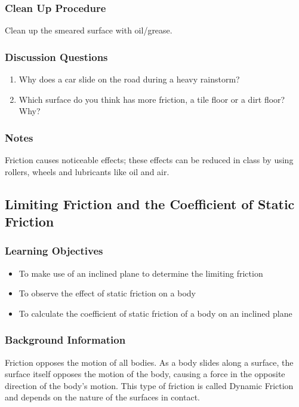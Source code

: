 \subsubsection*{Clean Up Procedure}
Clean up the smeared surface with oil/grease.

\subsubsection*{Discussion Questions}
\begin{enumerate}
\item{Why does a car slide on the road during a heavy rainstorm?}
\item{Which surface do you think has more friction, a tile floor or a dirt floor? Why?}
\end{enumerate}

\subsubsection*{Notes}
Friction causes noticeable effects; these effects can be reduced in class by using rollers, wheels and lubricants like oil and air.

\subsection{Limiting Friction and the Coefficient of Static Friction}

\subsubsection*{Learning Objectives}
\begin{itemize}
\item{To make use of an inclined plane to determine the limiting friction} 
\item{To observe the effect of static friction on a body} 
\item{To calculate the coefficient of static friction of a body on an inclined plane} 
\end{itemize}

\subsubsection*{Background Information}
Friction opposes the motion of all bodies. As a body slides along a surface, the surface itself opposes the motion of the body, causing a force in the opposite direction of the body's motion. This type of friction is called Dynamic Friction and depends on the nature of the surfaces in contact.  

